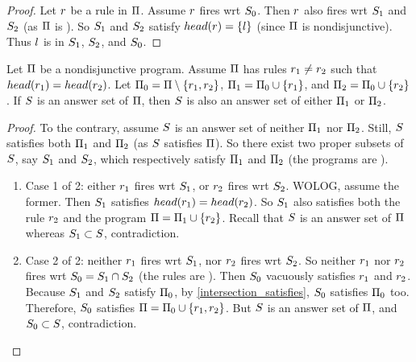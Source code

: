 \documentclass{paper}
\begin{document}
\begin{flushleft}
\begin{lemma}
\end{lemma}

\begin{proof}

Let $r$ be a rule in $\Pi$.
Assume $r$ fires wrt ${S}_{0}$.
Then $r$ also fires wrt ${S}_{1}$ and ${S}_{2}$
(as $\Pi$ is \dnf).
So ${S}_{1}$ and ${S}_{2}$ satisfy $head(r) = \{l\}$
(since $\Pi$ is nondisjunctive).
Thus $l$ is in ${S}_{1}$, ${S}_{2}$, and ${S}_{0}$.

\end{proof}

\begin{lemma}
[Proved by \mg]
\label{answer_set_subprogram}

Let $\Pi$ be a nondisjunctive \dnf{} \ap{} program.
Assume $\Pi$ has rules ${r}_{1} \ne {r}_{2}$ such that
$head({r}_{1}) = head({r}_{2})$.
Let ${\Pi}_{0} = \Pi \setminus \{{r}_{1}, {r}_{2}\}$,
${\Pi}_{1} = {\Pi}_{0} \cup \{{r}_{1}\}$,
and ${\Pi}_{2} = {\Pi}_{0} \cup \{{r}_{2}\}$.
If $S$ is an answer set of $\Pi$, then $S$ is also
an answer set of either ${\Pi}_{1}$ or ${\Pi}_{2}$.

\end{lemma}

\begin{proof}

To the contrary, assume $S$ is an answer set of neither
${\Pi}_{1}$ nor ${\Pi}_{2}$.
Still, $S$ satisfies both ${\Pi}_{1}$ and ${\Pi}_{2}$
(as $S$ satisfies $\Pi$).
So there exist two proper subsets of $S$, say
${S}_{1}$ and ${S}_{2}$,
which respectively satisfy ${\Pi}_{1}$ and ${\Pi}_{2}$
(the programs are \dnf{}).

\begin{enumerate}

\item
Case 1 of 2: either ${r}_{1}$ fires wrt ${S}_{1}$, or
${r}_{2}$ fires wrt ${S}_{2}$.
WOLOG, assume the former. Then ${S}_{1}$ satisfies
$head({r}_{1}) = head({r}_{2})$.
So ${S}_{1}$ also satisfies both the rule ${r}_{2}$ and the
program $\Pi = {\Pi}_{1} \cup \{{r}_{2}\}$.
Recall that $S$ is an answer set of $\Pi$ whereas
${S}_{1} \subset S$, contradiction.

\item
Case 2 of 2: neither ${r}_{1}$ fires wrt ${S}_{1}$, nor
${r}_{2}$ fires wrt ${S}_{2}$.
So neither ${r}_{1}$ nor ${r}_{2}$ fires wrt
${S}_{0} = {S}_{1} \cap {S}_{2}$
(the rules are \dnf).
Then ${S}_{0}$ vacuously satisfies ${r}_{1}$ and ${r}_{2}$.
Because ${S}_{1}$ and ${S}_{2}$ satisfy ${\Pi}_{0}$,
by \ref{intersection_satisfies},
${S}_{0}$ satisfies ${\Pi}_{0}$ too.
Therefore, ${S}_{0}$ satisfies
$\Pi = {\Pi}_{0} \cup \{{r}_{1}, {r}_{2}\}$.
But $S$ is an answer set of $\Pi$, and
${S}_{0} \subset S$, contradiction.


\end{enumerate}
\end{proof}
\end{flushleft}
\end{document}
